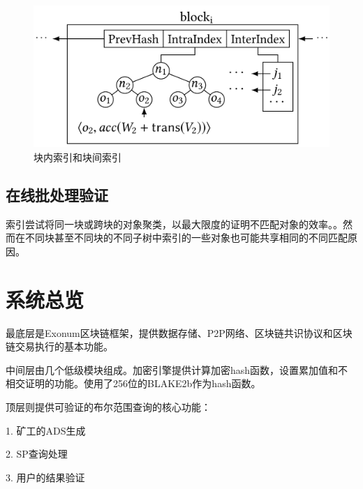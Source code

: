 \documentclass{article}
\begin{document}
\begin{figure}[H]
    \centering
    \includegraphics[width=12cm]{img/vchain-2.png}
    \caption{块内索引和块间索引}
\end{figure}

\subsection{在线批处理验证}

索引尝试将同一块或跨块的对象聚类，以最大限度的证明不匹配对象的效率。。然而在不同块甚至不同块的不同子树中索引的一些对象也可能共享相同的不同匹配原因。

\section{系统总览}

最底层是Exonum区块链框架，提供数据存储、P2P网络、区块链共识协议和区块链交易执行的基本功能。

中间层由几个低级模块组成。加密引擎提供计算加密hash函数，设置累加值和不相交证明的功能。使用了256位的BLAKE2b作为hash函数。

顶层则提供可验证的布尔范围查询的核心功能：

1. 矿工的ADS生成

2. SP查询处理

3. 用户的结果验证
\end{document}
